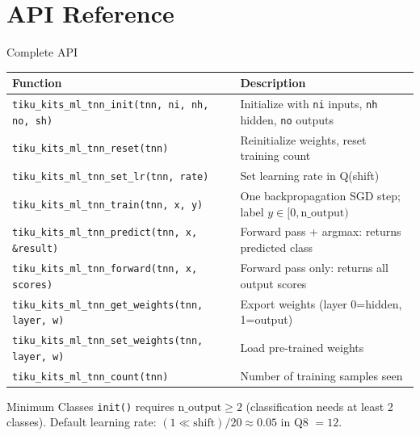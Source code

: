 \documentclass[aspectratio=169, 10pt]{beamer}
\begin{document}
\section{API Reference}

\begin{frame}[fragile]{Complete API}
\begin{table}
\centering
\small
\begin{tabular}{@{}lp{8cm}@{}}
\toprule
\textbf{Function} & \textbf{Description} \\
\midrule
\texttt{tiku\_kits\_ml\_tnn\_init(tnn, ni, nh, no, sh)}
  & Initialize with \texttt{ni} inputs, \texttt{nh} hidden, \texttt{no} outputs \\
\texttt{tiku\_kits\_ml\_tnn\_reset(tnn)}
  & Reinitialize weights, reset training count \\
\texttt{tiku\_kits\_ml\_tnn\_set\_lr(tnn, rate)}
  & Set learning rate in Q(shift) \\
\midrule
\texttt{tiku\_kits\_ml\_tnn\_train(tnn, x, y)}
  & One backpropagation SGD step; label $y \in [0, \text{n\_output})$ \\
\texttt{tiku\_kits\_ml\_tnn\_predict(tnn, x, \&result)}
  & Forward pass + argmax: returns predicted class \\
\texttt{tiku\_kits\_ml\_tnn\_forward(tnn, x, scores)}
  & Forward pass only: returns all output scores \\
\midrule
\texttt{tiku\_kits\_ml\_tnn\_get\_weights(tnn, layer, w)}
  & Export weights (layer 0=hidden, 1=output) \\
\texttt{tiku\_kits\_ml\_tnn\_set\_weights(tnn, layer, w)}
  & Load pre-trained weights \\
\texttt{tiku\_kits\_ml\_tnn\_count(tnn)}
  & Number of training samples seen \\
\bottomrule
\end{tabular}
\end{table}

\vspace{0.3em}
\begin{alertblock}{Minimum Classes}
\texttt{init()} requires $\text{n\_output} \geq 2$ (classification needs at least 2 classes).
Default learning rate: $(1 \ll \text{shift}) / 20 \approx 0.05$ in Q8 $= 12$.
\end{alertblock}
\end{frame}
\end{document}

